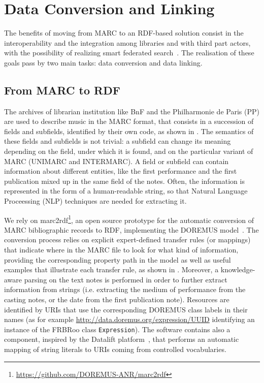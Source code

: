 \documentclass{article}
\begin{document}

\section{Data Conversion and Linking}
\label{sec:conversion-linking}
The benefits of moving from MARC to an RDF-based solution consist in the interoperability and the integration among libraries and with third part actors, with the possibility of realizing smart federated search~\cite{byrne2010strongest}. The realisation of these goals pass by two main tasks: data conversion and data linking.

\subsection{From MARC to RDF}
The archives of librarian institution like BnF and the Philharmonie de Paris (PP) are used to describe music in the MARC format, that consists in a succession of fields and subfields, identified by their own code, as shown in . The semantics of these fields and subfields is not trivial: a subfield can change its meaning depending on the field, under which it is found, and on the particular variant of MARC (UNIMARC and INTERMARC). A field or subfield can contain information about different entities, like the first performance and the first publication mixed up in the same field of the notes. Often, the information is represented in the form of a human-readable string, so that Natural Language Proceessing (NLP) techniques are needed for extracting it.

We rely on {\smallsc marc2rdf}\footnote{\url{https://github.com/DOREMUS-ANR/marc2rdf}}, an open source prototype for the automatic conversion of MARC bibliographic records to RDF, implementing the DOREMUS model~\cite{lisena2016exploring}. The conversion process relies on explicit expert-defined transfer rules (or mappings) that indicate where in the MARC file to look for what kind of information, providing the corresponding property path in the model as well as useful examples that illustrate each transfer rule, as shown in . Moreover, a knowledge-aware parsing on the text notes is performed in order to further extract information from strings (i.e. extracting the medium of performance from the casting notes, or the date from the first publication note). Resources are identified by URIs that use the corresponding DOREMUS class labels in their names (as for example \url{http://data.doremus.org/expression/UUID} identifying an instance of the FRBRoo class \texttt{Expression}). The software contains also a  component, inspired by the Datalift platform~\cite{scharffe2012enabling}, that performs an automatic mapping of string literals to URIs coming from controlled vocabularies.
\end{document}
